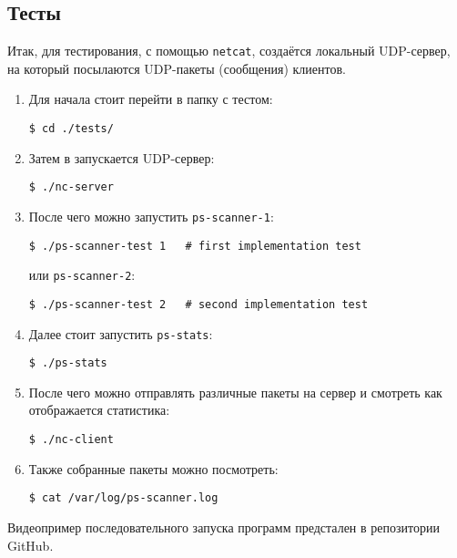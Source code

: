 \subsection{Тесты}

Итак, для тестирования, с помощью \verb|netcat|, создаётся локальный UDP-сервер, на который посылаются UDP-пакеты (сообщения) клиентов.

\begin{enumerate}
\item Для начала стоит перейти в папку с тестом:
\begin{lstlisting}
$ cd ./tests/
\end{lstlisting}

\item Затем в запускается UDP-сервер:
\begin{lstlisting}
$ ./nc-server
\end{lstlisting}

\newpage

\item После чего можно запустить \verb|ps-scanner-1|:
\begin{lstlisting}
$ ./ps-scanner-test 1   # first implementation test
\end{lstlisting}
или \verb|ps-scanner-2|:
\begin{lstlisting}
$ ./ps-scanner-test 2   # second implementation test
\end{lstlisting}

\item Далее стоит запустить \verb|ps-stats|:
\begin{lstlisting}
$ ./ps-stats
\end{lstlisting}

\item После чего можно отправлять различные пакеты на сервер и смотреть как отображается статистика:
\begin{lstlisting}
$ ./nc-client
\end{lstlisting}

\item Также собранные пакеты можно посмотреть:
\begin{lstlisting}
$ cat /var/log/ps-scanner.log
\end{lstlisting}

\end{enumerate}

\linespace

Видеопример последовательного запуска программ предстален в репозитории GitHub.
